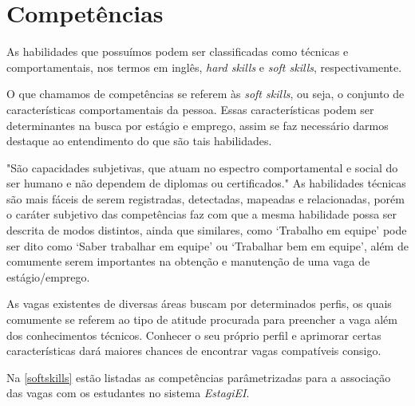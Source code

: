 \section{Competências}

As habilidades que possuímos podem ser classificadas como técnicas e comportamentais, nos termos em inglês, \emph{hard skills} e \emph{soft skills}, respectivamente.

O que chamamos de competências se referem às \emph{soft skills}, ou seja, o conjunto de características comportamentais da pessoa. Essas características podem ser determinantes na busca por estágio e emprego, assim se faz necessário darmos destaque ao entendimento do que são tais habilidades.

"São capacidades subjetivas, que atuam no espectro comportamental e social do ser humano e não dependem de diplomas ou certificados."\cite{alura_softskills} As habilidades técnicas são mais fáceis de serem registradas, detectadas, mapeadas e relacionadas, porém o caráter subjetivo das competências faz com que a mesma habilidade possa ser descrita de modos distintos, ainda que similares, como `Trabalho em equipe' pode ser dito como `Saber trabalhar em equipe' ou `Trabalhar bem em equipe', além de comumente serem importantes na obtenção e manutenção de uma vaga de estágio/emprego.

As vagas existentes de diversas áreas buscam por determinados perfis, os quais comumente se referem ao tipo de atitude procurada para preencher a vaga além dos conhecimentos técnicos. Conhecer o seu próprio perfil e aprimorar certas características dará maiores chances de encontrar vagas compatíveis consigo.

Na \autoref{softskills} estão listadas as competências parâmetrizadas para a associação das vagas com os estudantes no sistema \emph{EstagiEI}.